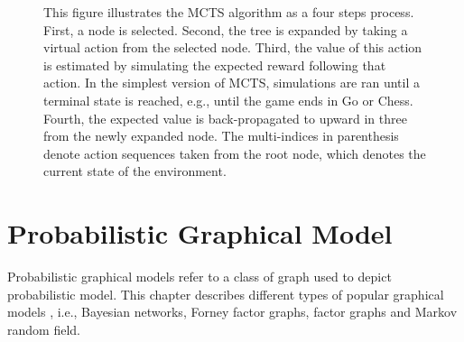 \documentclass[11pt,fleqn]{book} %
\begin{document}
{\begin{figure}[H]
\begin{center}
	\end{center}
\vspace{-0.25cm}
    \caption{
This figure illustrates the MCTS algorithm as a four steps process. First, a node is selected. Second, the tree is expanded by taking a virtual action from the selected node. Third, the value of this action is estimated by simulating the expected reward following that action. In the simplest version of MCTS, simulations are ran until a terminal state is reached, e.g., until the game ends in Go or Chess. Fourth, the expected value is back-propagated to upward in three from the newly expanded node. The multi-indices in parenthesis denote action sequences taken from the root node, which denotes the current state of the environment.}
    \label{fig:MCTS}
\end{figure}
}


\chapter{Probabilistic Graphical Model}

Probabilistic graphical models refer to a class of graph used to depict probabilistic model. This chapter describes different types of popular graphical models \citep{GraphicalModels}, i.e., Bayesian networks, Forney factor graphs, factor graphs and Markov random field.
\end{document}
